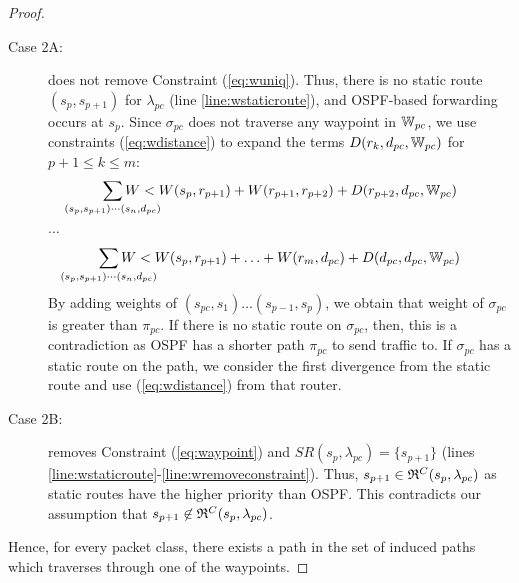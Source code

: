 \begin{proof}
\begin{description}
	\item[Case 2A:]
	 does not remove Constraint (\ref{eq:wuniq}). 
	Thus, there is no static route $(s_p, s_{p+1})$ for
	$\lambda_{pc}$ (line \ref{line:wstaticroute}), and 
	OSPF-based forwarding occurs at $s_{p}$. 
	Since $\sigma_{pc}$ does not traverse any 
	waypoint in $\mathbb{W}_{pc}$,
	we use constraints (\ref{eq:wdistance}) 
	to expand the terms $D(r_k, d_{pc}, \mathbb{W}_{pc})$ for $p+1 \leq k \leq m$:
	\[
	\sum_{\mathclap{\substack{(s_{p}, s_{p+1})\cdots(s_n, d_{pc})}}} 
	W < W(s_{p}, r_{p+1})+ W(r_{p+1}, r_{p+2}) + D(r_{p+2}, d_{pc},\waypt_{pc})
	\] 
	\begin{center}
		$\ldots$
	\end{center}
	\[
	\sum_{\mathclap{\substack{(s_{p}, s_{p+1})\cdots(s_n, d_{pc})}}} 
	W < W(s_{p}, r_{p+1})+ \ldots + W(r_{m}, d_{pc}) + D(d_{pc}, d_{pc}, \waypt_{pc})
	\]
	By adding weights of $(s_{pc}, s_1)\ldots(s_{p-1}, s_p)$, we obtain that weight of $\sigma_{pc}$ 
	is greater than $\pi_{pc}$. If there is no static route on $\sigma_{pc}$, then, this is a contradiction
	as OSPF has a shorter path $\pi_{pc}$ to send traffic to.  If $\sigma_{pc}$ has a static route on the
	path, we consider the first divergence from the static route and use (\ref{eq:wdistance}) from that
	router. 
	
	\item[Case 2B:]
	 removes Constraint (\ref{eq:waypoint}) 
	and $SR(s_p, \lambda_{pc}) = \{s_{p+1}\}$ (lines \ref{line:wstaticroute}-\ref{line:wremoveconstraint}). 
	Thus, $s_{p+1} \in \mathfrak{R}^C(s_{p}, \lambda_{pc})$ as static routes 
	have the higher priority than OSPF. This contradicts our assumption
	that $s_{p+1} \not\in \mathfrak{R}^C(s_{p}, \lambda_{pc})$. 
	\end{description}
	
	Hence, for every packet class, 
	there exists a path in the set of induced paths which traverses through one of the waypoints. 
	\end{proof}